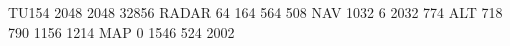 TU154 2048 2048 32856
RADAR    64  164  564  508
NAV    1032    6 2032  774
ALT     718  790 1156 1214
MAP       0 1546  524 2002
